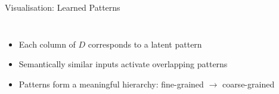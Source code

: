 \documentclass{beamer}
\begin{document}
\begin{frame}{Visualisation: Learned Patterns}
    \begin{columns}
        \begin{itemize}
            \setlength{\itemsep}{0.6em}
            \item Each column of \(D\) corresponds to a latent pattern
            \item Semantically similar inputs activate overlapping patterns
            \item Patterns form a meaningful hierarchy: fine-grained \(\to\) coarse-grained
        \end{itemize}
        \begin{center}
        \end{center}
    \end{columns}
\end{frame}
\end{document}
